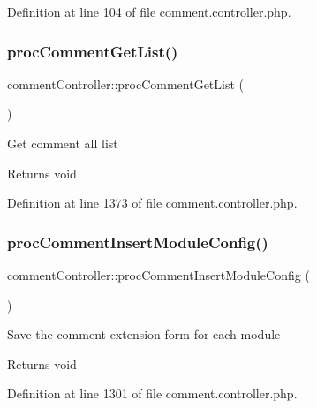 Definition at line 104 of file comment.\+controller.\+php.

\mbox{\label{classcommentController_ac9edb9826c8b07ceb1a4db29c5db514a}} 
\subsubsection{\texorpdfstring{proc\+Comment\+Get\+List()}{procCommentGetList()}}
{\footnotesize\ttfamily comment\+Controller\+::proc\+Comment\+Get\+List (\begin{DoxyParamCaption}{ }\end{DoxyParamCaption})}

Get comment all list \begin{DoxyReturn}{Returns}
void 
\end{DoxyReturn}


Definition at line 1373 of file comment.\+controller.\+php.

\mbox{\label{classcommentController_ab4a71283244210be754cceb8511e8789}} 
\subsubsection{\texorpdfstring{proc\+Comment\+Insert\+Module\+Config()}{procCommentInsertModuleConfig()}}
{\footnotesize\ttfamily comment\+Controller\+::proc\+Comment\+Insert\+Module\+Config (\begin{DoxyParamCaption}{ }\end{DoxyParamCaption})}

Save the comment extension form for each module \begin{DoxyReturn}{Returns}
void 
\end{DoxyReturn}


Definition at line 1301 of file comment.\+controller.\+php.

\mbox{\label{classcommentController_ae5c2ce138a0c36f2d7fb4f1fdcfad800}} 
